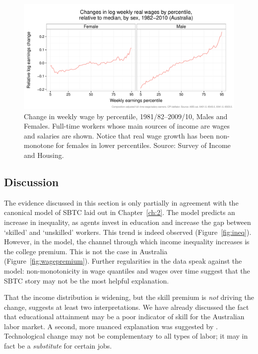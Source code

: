 \begin{figure}
  \centering
  \includegraphics[width=\textwidth]{../figure/quantile_mf.pdf}
  \caption{Change in weekly wage by percentile, 1981/82--2009/10, Males and Females. Full-time workers whose main sources of income are wages and salaries are shown. Notice that real wage growth has been non-monotone for females in lower percentiles. Source: Survey of Income and Housing.}
  \label{fig:banana}
\end{figure}

\subsection{Discussion}

The evidence discussed in this section is only partially in agreement with the canonical model of SBTC laid out in Chapter~\ref{ch:2}. The model predicts an increase in inequality, as agents invest in education and increase the gap between `skilled' and `unskilled' workers. This trend is indeed observed (Figure~\ref{fig:ineq}). However, in the model, the channel through which income inequality increases is the college premium. This is not the case in Australia (Figure~\ref{fig:wagepremium}). Further regularities in the data speak against the model: non-monotonicity in wage quantiles and wages over time suggest that the SBTC story may not be the most helpful explanation.

That the income distribution is widening, but the skill premium is {\em not} driving the change, suggests at least two interpretations. We have already discussed the fact that educational attainment may be a poor indicator of skill for the Australian labor market. A second, more nuanced explanation was suggested by \citet{Levy2003}. Technological change may not be complementary to all types of labor; it may in fact be a {\em substitute} for certain jobs.

